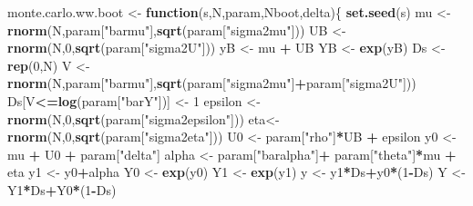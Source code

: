 \documentclass[]{book}
\newenvironment{Shaded}{\begin{snugshade}}{\end{snugshade}}
\newcommand{\ControlFlowTok}[1]{\textcolor[rgb]{0.13,0.29,0.53}{\textbf{#1}}}
\newcommand{\DecValTok}[1]{\textcolor[rgb]{0.00,0.00,0.81}{#1}}
\newcommand{\KeywordTok}[1]{\textcolor[rgb]{0.13,0.29,0.53}{\textbf{#1}}}
\newcommand{\NormalTok}[1]{#1}
\newcommand{\OperatorTok}[1]{\textcolor[rgb]{0.81,0.36,0.00}{\textbf{#1}}}
\newcommand{\StringTok}[1]{\textcolor[rgb]{0.31,0.60,0.02}{#1}}
\theoremstyle{definition}
\theoremstyle{definition}
\theoremstyle{definition}
\theoremstyle{remark}
\begin{document}
\begin{Shaded}
\begin{Highlighting}[]
\NormalTok{monte.carlo.ww.boot <-}\StringTok{ }\ControlFlowTok{function}\NormalTok{(s,N,param,Nboot,delta)\{}
  \KeywordTok{set.seed}\NormalTok{(s)}
\NormalTok{  mu <-}\StringTok{ }\KeywordTok{rnorm}\NormalTok{(N,param[}\StringTok{"barmu"}\NormalTok{],}\KeywordTok{sqrt}\NormalTok{(param[}\StringTok{"sigma2mu"}\NormalTok{]))}
\NormalTok{  UB <-}\StringTok{ }\KeywordTok{rnorm}\NormalTok{(N,}\DecValTok{0}\NormalTok{,}\KeywordTok{sqrt}\NormalTok{(param[}\StringTok{"sigma2U"}\NormalTok{]))}
\NormalTok{  yB <-}\StringTok{ }\NormalTok{mu }\OperatorTok{+}\StringTok{ }\NormalTok{UB }
\NormalTok{  YB <-}\StringTok{ }\KeywordTok{exp}\NormalTok{(yB)}
\NormalTok{  Ds <-}\StringTok{ }\KeywordTok{rep}\NormalTok{(}\DecValTok{0}\NormalTok{,N)}
\NormalTok{  V <-}\StringTok{ }\KeywordTok{rnorm}\NormalTok{(N,param[}\StringTok{"barmu"}\NormalTok{],}\KeywordTok{sqrt}\NormalTok{(param[}\StringTok{"sigma2mu"}\NormalTok{]}\OperatorTok{+}\NormalTok{param[}\StringTok{"sigma2U"}\NormalTok{]))}
\NormalTok{  Ds[V}\OperatorTok{<=}\KeywordTok{log}\NormalTok{(param[}\StringTok{"barY"}\NormalTok{])] <-}\StringTok{ }\DecValTok{1} 
\NormalTok{  epsilon <-}\StringTok{ }\KeywordTok{rnorm}\NormalTok{(N,}\DecValTok{0}\NormalTok{,}\KeywordTok{sqrt}\NormalTok{(param[}\StringTok{"sigma2epsilon"}\NormalTok{]))}
\NormalTok{  eta<-}\StringTok{ }\KeywordTok{rnorm}\NormalTok{(N,}\DecValTok{0}\NormalTok{,}\KeywordTok{sqrt}\NormalTok{(param[}\StringTok{"sigma2eta"}\NormalTok{]))}
\NormalTok{  U0 <-}\StringTok{ }\NormalTok{param[}\StringTok{"rho"}\NormalTok{]}\OperatorTok{*}\NormalTok{UB }\OperatorTok{+}\StringTok{ }\NormalTok{epsilon}
\NormalTok{  y0 <-}\StringTok{ }\NormalTok{mu }\OperatorTok{+}\StringTok{  }\NormalTok{U0 }\OperatorTok{+}\StringTok{ }\NormalTok{param[}\StringTok{"delta"}\NormalTok{]}
\NormalTok{  alpha <-}\StringTok{ }\NormalTok{param[}\StringTok{"baralpha"}\NormalTok{]}\OperatorTok{+}\StringTok{  }\NormalTok{param[}\StringTok{"theta"}\NormalTok{]}\OperatorTok{*}\NormalTok{mu }\OperatorTok{+}\StringTok{ }\NormalTok{eta}
\NormalTok{  y1 <-}\StringTok{ }\NormalTok{y0}\OperatorTok{+}\NormalTok{alpha}
\NormalTok{  Y0 <-}\StringTok{ }\KeywordTok{exp}\NormalTok{(y0)}
\NormalTok{  Y1 <-}\StringTok{ }\KeywordTok{exp}\NormalTok{(y1)}
\NormalTok{  y <-}\StringTok{ }\NormalTok{y1}\OperatorTok{*}\NormalTok{Ds}\OperatorTok{+}\NormalTok{y0}\OperatorTok{*}\NormalTok{(}\DecValTok{1}\OperatorTok{-}\NormalTok{Ds)}
\NormalTok{  Y <-}\StringTok{ }\NormalTok{Y1}\OperatorTok{*}\NormalTok{Ds}\OperatorTok{+}\NormalTok{Y0}\OperatorTok{*}\NormalTok{(}\DecValTok{1}\OperatorTok{-}\NormalTok{Ds)}

\end{Highlighting}
\end{Shaded}
\end{document}
